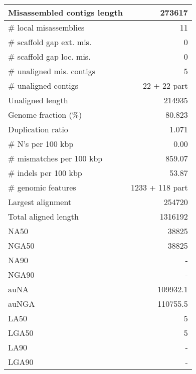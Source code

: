 \documentclass[12pt,a4paper]{article}
\begin{document}
\begin{table}[ht]
\begin{center}
\begin{tabular}{|l*{1}{|r}|}
Misassembled contigs length & 273617 \\ \hline
\# local misassemblies & 11 \\ \hline
\# scaffold gap ext. mis. & 0 \\ \hline
\# scaffold gap loc. mis. & 0 \\ \hline
\# unaligned mis. contigs & 5 \\ \hline
\# unaligned contigs & 22 + 22 part \\ \hline
Unaligned length & 214935 \\ \hline
Genome fraction (\%) & 80.823 \\ \hline
Duplication ratio & 1.071 \\ \hline
\# N's per 100 kbp & 0.00 \\ \hline
\# mismatches per 100 kbp & 859.07 \\ \hline
\# indels per 100 kbp & 53.87 \\ \hline
\# genomic features & 1233 + 118 part \\ \hline
Largest alignment & 254720 \\ \hline
Total aligned length & 1316192 \\ \hline
NA50 & 38825 \\ \hline
NGA50 & 38825 \\ \hline
NA90 & - \\ \hline
NGA90 & - \\ \hline
auNA & 109932.1 \\ \hline
auNGA & 110755.5 \\ \hline
LA50 & 5 \\ \hline
LGA50 & 5 \\ \hline
LA90 & - \\ \hline
LGA90 & - \\ \hline
\end{tabular}
\end{center}
\end{table}
\end{document}

